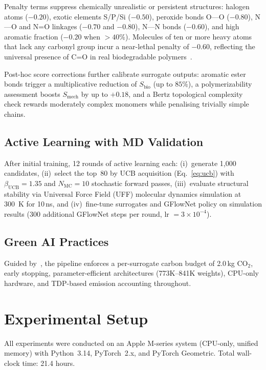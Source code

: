 \documentclass[twocolumn,10pt]{article}
\begin{document}
Penalty terms suppress chemically unrealistic or persistent structures: halogen atoms
($-0.20$), exotic elements S/P/Si ($-0.50$), peroxide bonds O---O ($-0.80$),
N---O and N=O linkages ($-0.70$ and $-0.80$), N---N bonds ($-0.60$), and high aromatic
fraction ($-0.20$ when $> 40\%$). Molecules of ten or more heavy atoms that lack any
carbonyl group incur a near-lethal penalty of $-0.60$, reflecting the universal
presence of C=O in real biodegradable polymers~\cite{tokiwa2006biodegradability}.

Post-hoc score corrections further calibrate surrogate outputs: aromatic ester bonds
trigger a multiplicative reduction of $S_\text{bio}$ (up to $85\%$), a polymerizability
assessment boosts $S_\text{mech}$ by up to $+0.18$, and a Bertz topological complexity
check rewards moderately complex monomers while penalising trivially simple chains.

\subsection{Active Learning with MD Validation}
After initial training, 12 rounds of active learning each: (i)~generate 1,000 candidates, (ii)~select the top~80 by UCB acquisition (Eq.~\ref{eq:ucb}) with $\beta_\text{UCB}=1.35$ and $N_\text{MC} = 10$ stochastic forward passes, (iii)~evaluate structural stability via Universal Force Field (UFF) molecular dynamics simulation at 300~K for 10\,ns, and (iv)~fine-tune surrogates and GFlowNet policy on simulation results (300 additional GFlowNet steps per round, lr $= 3 \times 10^{-4}$).

\subsection{Green AI Practices}
Guided by~\cite{schwartz2020green,patterson2021carbon}, the pipeline enforces a per-surrogate
carbon budget of 2.0\,kg CO$_2$, early stopping, parameter-efficient architectures
(773K–841K weights), CPU-only hardware, and TDP-based emission accounting throughout.

\section{Experimental Setup}

All experiments were conducted on an Apple M-series system (CPU-only, unified memory) with Python~3.14, PyTorch~2.x, and PyTorch Geometric. Total wall-clock time: 21.4 hours.
\end{document}
